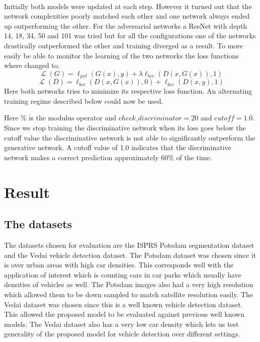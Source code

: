\documentclass{kththesis}
\DeclareMathOperator{\Lagr}{\mathcal{L}}
\begin{document}
\\
Initially both models were updated at each step. However it turned out that the network complexities poorly matched each other and one network always ended up outperforming the other. For the adversarial networks a ResNet with depth 14, 18, 34, 50 and 101 was tried but for all the configurations one of the networks drastically outperformed the other and training diverged as a result. To more easily be able to monitor the learning of the two networks the loss functions where changed to.
\begin{equation}
\Lagr(G) = \ell_{pxl}(G(x),y)+\lambda\ell_{bce}(D(x,G(x)), 1)
\end{equation}
\begin{equation}
\Lagr(D) =\ell_{bce}(D(x,G(x)), 0) + \ell_{bce}(D(x,y), 1)
\end{equation}
Here both networks tries to minimize its respective loss function. An alternating training regime described below could now be used.

Here \% is the modulus operator and $check\_discriminator=20$ and $cutoff=1.0$. Since we stop training the discriminative network when its loss goes below the cutoff value the discriminative network is not able to significantly outperform the generative network. A cutoff value of 1.0 indicates that the discriminative network makes a correct prediction approximately 60\% of the time.\\
\chapter{Result}
\section{The datasets}
The datasets chosen for evaluation are the ISPRS Potsdam segmentation dataset and the Vedai vehicle detection dataset. The Potsdam dataset was chosen since it is over urban areas with high car densities. This corresponds well with the application of interest which is counting cars in car parks which usually have densities of vehicles as well. The Potsdam images also had a very high resolution which allowed them to be down sampled to match satellite resolution easily. The Vedai dataset was chosen since this is a well known vehicle detection dataset. This allowed the proposed model to be evaluated against previous well known models. The Vedai dataset also has a very low car density which lets us test generality of the proposed model for vehicle detection over different settings.
\end{document}
